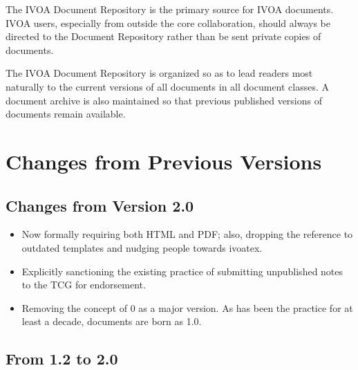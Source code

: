 \documentclass[11pt,a4paper]{ivoa}
\begin{document}
The IVOA Document Repository is the primary source for IVOA documents.
IVOA users, especially from outside the core collaboration, should
always be directed to the Document Repository rather than be sent
private copies of documents.

The IVOA Document Repository is organized so as to lead readers most
naturally to the current versions of all documents in all document
classes.  A document archive is also maintained so that previous
published versions of documents remain available.

\appendix
\section{Changes from Previous Versions}

\subsection{Changes from Version 2.0}

\begin{itemize}
\item Now formally requiring both HTML and PDF; also, dropping the
reference to outdated templates and nudging people towards ivoatex.

\item Explicitly sanctioning the existing practice of submitting
unpublished notes to the TCG for endorsement.

\item Removing the concept of 0 as a major version.  As has been the
practice for at least a decade, documents are born as 1.0.
\end{itemize}


\subsection{From 1.2 to 2.0}
\end{document}
